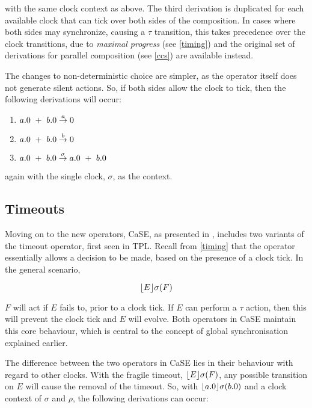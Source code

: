 \noindent with the same clock context as above.  The third derivation
is duplicated for each available clock that can tick over both sides
of the composition.  In cases where both sides may synchronize,
causing a $\tau$ transition, this takes precedence over the clock
transitions, due to \emph{maximal progress} (see \ref{timing}) and the
original set of derivations for parallel composition (see \ref{ccs})
are available instead.

The changes to non-deterministic choice are simpler, as the operator itself
does not generate silent actions.  So, if both sides allow the clock to tick,
then the following derivations will occur:

\begin{enumerate}
\item $a.0\ +\ b.0 \stackrel{a}{\rightarrow} 0$
\item $a.0\ +\ b.0 \stackrel{b}{\rightarrow} 0$
\item $a.0\ +\ b.0 \derives{\sigma} a.0\ +\ b.0$
\end{enumerate}

\noindent again with the single clock, $\sigma$, as the context.

\subsection{Timeouts}
\label{timeouts}

Moving on to the new operators, CaSE, as presented in
\cite{norton05alg}, includes two variants of the timeout operator,
first seen in TPL.  Recall from \ref{timing} that the operator
essentially allows a decision to be made, based on the presence of a
clock tick.  In the general scenario,

\begin{equation}
\lfloor{E}\rfloor {\sigma} ({F})
\end{equation}

\noindent $F$ will act if $E$ fails to, prior to a clock tick.  If $E$
can perform a $\tau$ action, then this will prevent the clock tick and
$E$ will evolve. Both operators in CaSE maintain this core behaviour,
which is central to the concept of global synchronisation explained
earlier.

The difference between the two operators in CaSE lies in their
behaviour with regard to other clocks.  With the fragile timeout,
$\lfloor{E}\rfloor {\sigma} ({F})$, any possible transition on $E$ will cause the
removal of the timeout.  So, with $\lfloor{a.0}\rfloor {\sigma} ({b.0})$ and a clock
context of $\sigma$ and $\rho$, the following derivations can occur:

